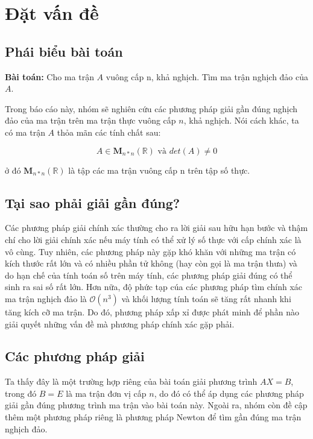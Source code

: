 \section{Đặt vấn đề}
    \subsection{Phái biểu bài toán}
        \par \textbf{Bài toán: } Cho ma trận $A$ vuông cấp n, khả nghịch. Tìm ma trận nghịch đảo của $A$.

        \par Trong báo cáo này, nhóm sẽ nghiên cứu các phương pháp giải gần đúng nghịch đảo của ma trận trên ma trận thực vuông cấp $n$, khả nghịch. Nói cách khác, ta có ma trận $ A $ thỏa mãn các tính chất sau:

        $$ A \in \mathbf{M}_{n*n} (\mathbb{R}) \text{  và  } det(A) \neq 0 $$ 

        \par ở đó $ \mathbf{M}_{n*n} (\mathbb{R}) $ là tập các ma trận vuông cấp n trên tập số thực.
            
    \subsection{Tại sao phải giải gần đúng?}
        \par Các phương pháp giải chính xác thường cho ra lời giải sau hữu hạn bước và thậm chí cho lời giải chính xác nếu máy tính có thể xử lý số thực với cấp chính xác là vô cùng. Tuy nhiên, các phương pháp này gặp khó khăn với những ma trận có kích thước rất lớn và có nhiều phần tử không (hay còn gọi là ma trận thưa) và do hạn chế của tính toán số trên máy tính, các phương pháp giải đúng có thể sinh ra sai số rất lớn. Hơn nữa, độ phức tạp cúa các phương pháp tìm chính xác ma trận nghịch đảo là $\mathcal{O} (n^{3})$ và khối lượng tính toán sẽ tăng rất nhanh khi tăng kích cỡ ma trận. Do đó, phương pháp xấp xỉ được phát minh để phần nào giải quyết những vấn đề mà phương pháp chính xác gặp phải. 
            
    \subsection{Các phương pháp giải}
        \par Ta thấy đây là một trường hợp riêng của bài toán giải phương trình $ A X = B $, trong đó $B = E $ là ma trận đơn vị cấp $n$, do đó có thể áp dụng các phương pháp giải gần đúng phương trình ma trận vào bài toán này. Ngoài ra, nhóm còn đề cập thêm một phương pháp riêng là phương pháp Newton để tìm gần đúng ma trận nghịch đảo.

